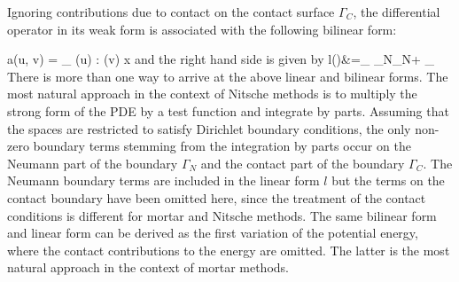 \documentclass[12pt]{article}
\newenvironment{alignno}{\linenomath\align}{\endalign\linenomath}
\newcommand{\mbf}[1]{\mathbf{#1}}
\newcommand{\Int}[1]{\int\limits_{ #1}}
\newcommand{\mrm}[1]{\mathrm{#1}}
\newcommand{\mbv}{\mbf{v}}
\newcommand{\md}{\mrm{d}}
\begin{document}
Ignoring contributions due to contact on the contact surface $\Gamma_C$, the differential operator in its weak form is associated with the following bilinear form:

\begin{alignno}
  a(\bm u, \bm v) = \int_{\Omega} \sigma (\bm u) : \epsilon (\bm v) \md x
\end{alignno}
 and the right hand side is given by
\begin{alignno}
          l(\mbv)&=\Int{\Gamma_N}{}\mbf{f}_N\cdot \mbv\md \Gamma + \Int{\Omega}{} \mbf{f} \cdot \mbv\mrm{dx}
\end{alignno}
There is more than one way to arrive at the above linear and bilinear forms. 
The most natural approach in the context of Nitsche methods is to multiply the strong form of the PDE by a test function and integrate by parts.
Assuming that the spaces are restricted to satisfy Dirichlet boundary conditions, the only non-zero boundary terms stemming from the integration by parts occur on the Neumann part of the boundary $\Gamma_N$ and the contact part of the boundary $\Gamma_C$.
The Neumann boundary terms are included in the linear form $l$ but the terms on the contact boundary have been omitted here, since the treatment of the contact conditions is different for mortar and Nitsche methods.
The same bilinear form and linear form can be derived as the first variation of the potential energy, where the contact contributions to the energy are omitted. The latter is the most natural approach in the context of mortar methods.

\end{document}
